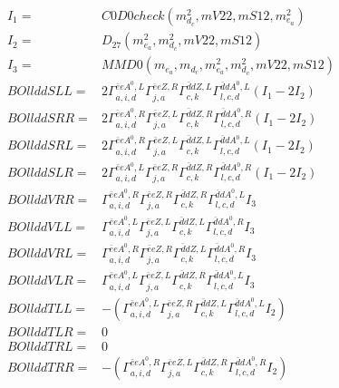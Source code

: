 \documentclass[A4,landscape]{article}
\begin{document}
\begin{align} 
I_1 = & C0D0check(m^2_{d_{{c}}}, mV22, mS12, m^2_{e_{{a}}}) \\ 
I_2 = & D_{27}(m^2_{e_{{a}}}, m^2_{d_{{c}}}, mV22, mS12) \\ 
I_3 = & MMD0(m_{e_{{a}}}, m_{d_{{c}}}, m^2_{e_{{a}}}, m^2_{d_{{c}}}, mV22, mS12) \\ 
  BOllddSLL= & 2  \Gamma^{\bar{e}e A^0 ,L}_{a, i, d} \Gamma^{\bar{e}e Z ,R}_{j, a} \Gamma^{\bar{d}d Z ,L}_{c, k} \Gamma^{\bar{d}d A^0 ,L}_{l, c, d} (I_1 - 2 I_2) \\ 
  BOllddSRR= & 2  \Gamma^{\bar{e}e A^0 ,R}_{a, i, d} \Gamma^{\bar{e}e Z ,L}_{j, a} \Gamma^{\bar{d}d Z ,R}_{c, k} \Gamma^{\bar{d}d A^0 ,R}_{l, c, d} (I_1 - 2 I_2) \\ 
  BOllddSRL= & 2  \Gamma^{\bar{e}e A^0 ,R}_{a, i, d} \Gamma^{\bar{e}e Z ,L}_{j, a} \Gamma^{\bar{d}d Z ,L}_{c, k} \Gamma^{\bar{d}d A^0 ,L}_{l, c, d} (I_1 - 2 I_2) \\ 
  BOllddSLR= & 2  \Gamma^{\bar{e}e A^0 ,L}_{a, i, d} \Gamma^{\bar{e}e Z ,R}_{j, a} \Gamma^{\bar{d}d Z ,R}_{c, k} \Gamma^{\bar{d}d A^0 ,R}_{l, c, d} (I_1 - 2 I_2) \\ 
  BOllddVRR= &  \Gamma^{\bar{e}e A^0 ,R}_{a, i, d} \Gamma^{\bar{e}e Z ,R}_{j, a} \Gamma^{\bar{d}d Z ,R}_{c, k} \Gamma^{\bar{d}d A^0 ,L}_{l, c, d} I_3 \\ 
  BOllddVLL= &  \Gamma^{\bar{e}e A^0 ,L}_{a, i, d} \Gamma^{\bar{e}e Z ,L}_{j, a} \Gamma^{\bar{d}d Z ,L}_{c, k} \Gamma^{\bar{d}d A^0 ,R}_{l, c, d} I_3 \\ 
  BOllddVRL= &  \Gamma^{\bar{e}e A^0 ,R}_{a, i, d} \Gamma^{\bar{e}e Z ,R}_{j, a} \Gamma^{\bar{d}d Z ,L}_{c, k} \Gamma^{\bar{d}d A^0 ,R}_{l, c, d} I_3 \\ 
  BOllddVLR= &  \Gamma^{\bar{e}e A^0 ,L}_{a, i, d} \Gamma^{\bar{e}e Z ,L}_{j, a} \Gamma^{\bar{d}d Z ,R}_{c, k} \Gamma^{\bar{d}d A^0 ,L}_{l, c, d} I_3 \\ 
  BOllddTLL= & -( \Gamma^{\bar{e}e A^0 ,L}_{a, i, d} \Gamma^{\bar{e}e Z ,R}_{j, a} \Gamma^{\bar{d}d Z ,L}_{c, k} \Gamma^{\bar{d}d A^0 ,L}_{l, c, d} I_2) \\ 
  BOllddTLR= & 0 \\ 
  BOllddTRL= & 0 \\ 
  BOllddTRR= & -( \Gamma^{\bar{e}e A^0 ,R}_{a, i, d} \Gamma^{\bar{e}e Z ,L}_{j, a} \Gamma^{\bar{d}d Z ,R}_{c, k} \Gamma^{\bar{d}d A^0 ,R}_{l, c, d} I_2) \\ 
\end{align} 
\end{document}
